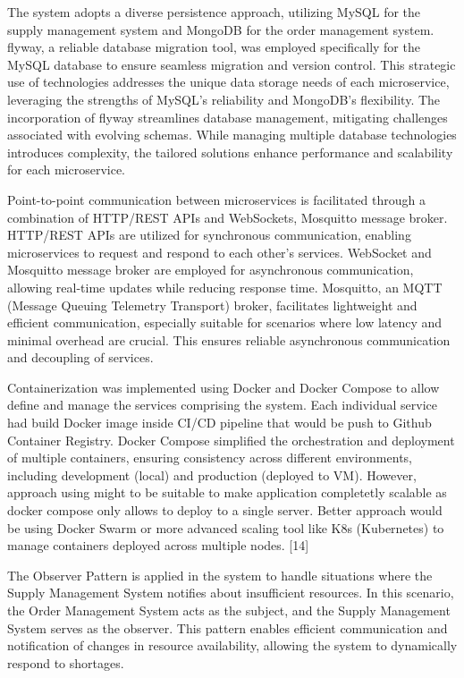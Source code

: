 \documentclass[conference]{IEEEtran}
\begin{document}
The system adopts a diverse persistence approach, utilizing MySQL for the supply management system and MongoDB for the order management system. flyway, a reliable database migration tool, was employed specifically for the MySQL database to ensure seamless migration and version control. This strategic use of technologies addresses the unique data storage needs of each microservice, leveraging the strengths of MySQL's reliability and MongoDB's flexibility. The incorporation of flyway streamlines database management, mitigating challenges associated with evolving schemas. While managing multiple database technologies introduces complexity, the tailored solutions enhance performance and scalability for each microservice.

Point-to-point communication between microservices is facilitated through a combination of HTTP/REST APIs and WebSockets, Mosquitto message broker. HTTP/REST APIs are utilized for synchronous communication, enabling microservices to request and respond to each other's services. WebSocket and Mosquitto message broker are employed for asynchronous communication, allowing real-time updates while reducing response time. Mosquitto, an MQTT (Message Queuing Telemetry Transport) broker, facilitates lightweight and efficient communication, especially suitable for scenarios where low latency and minimal overhead are crucial. This ensures reliable asynchronous communication and decoupling of services.

Containerization was implemented using Docker and Docker Compose to allow define and manage the services comprising the system. Each individual service had build Docker image inside CI/CD pipeline that would be push to Github Container Registry. Docker Compose simplified the orchestration and deployment of multiple containers, ensuring consistency across different environments, including development (local) and production (deployed to VM). However, approach using might to be suitable to make application completetly scalable as docker compose only allows to deploy to a single server. Better approach would be using Docker Swarm or more advanced scaling tool like K8s (Kubernetes) to manage containers deployed across multiple nodes. [14]

The Observer Pattern is applied in the system to handle situations where the Supply Management System notifies about insufficient resources. In this scenario, the Order Management System acts as the subject, and the Supply Management System serves as the observer. This pattern enables efficient communication and notification of changes in resource availability, allowing the system to dynamically respond to shortages. 
\end{document}
